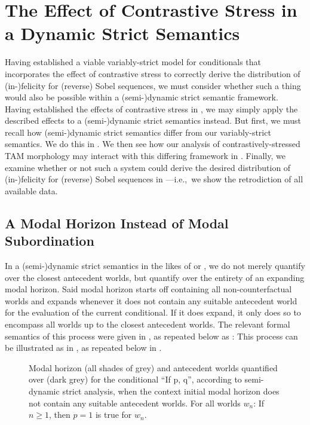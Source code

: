 \section{The Effect of Contrastive Stress in a Dynamic Strict Semantics}
Having established a viable variably-strict model for conditionals that incorporates the effect of contrastive stress to correctly derive the distribution of (in-)felicity for (reverse) Sobel sequences, we must consider whether such a thing would also be possible within a (semi-)dynamic strict semantic framework. Having established the effects of contrastive stress in , we may simply apply the described effects to a (semi-)dynamic strict semantics instead. But first, we must recall how (semi-)dynamic strict semantics differ from our variably-strict semantics. We do this in . We then see how our analysis of contrastively-stressed TAM morphology may interact with this differing framework in . Finally, we examine whether or not such a system could derive the desired distribution of (in-)felicity for (reverse) Sobel sequences in ---i.e.,~we show the retrodiction of all available data.

\subsection{A Modal Horizon Instead of Modal Subordination}
In a (semi-)dynamic strict semantics in the likes of \textcite{Fintel2001} or \textcite{Gillies2007}, we do not merely quantify over the closest antecedent worlds, but quantify over the entirety of an expanding modal horizon. Said modal horizon starts off containing all non-counterfactual worlds and expands whenever it does not contain any suitable antecedent world for the evaluation of the current conditional. If it does expand, it only does so to encompass all worlds up to the closest antecedent worlds. The relevant formal semantics of this process were given in , as repeated below as :
\pex{}\xe
This process can be illustrated as in , as repeated below in .
\begin{figure}[!htb]
\resizebox{\textwidth}{!}{}
\caption{Modal horizon (all shades of grey) and antecedent worlds quantified over (dark grey) for the conditional \enquote{If p, q}, according to  semi-dynamic strict analysis, when the context initial modal horizon does not contain any suitable antecedent worlds. For all worlds $w_n$: If $n\geqslant1$, then $p=1$ is true for $w_n$.}
\end{figure}


